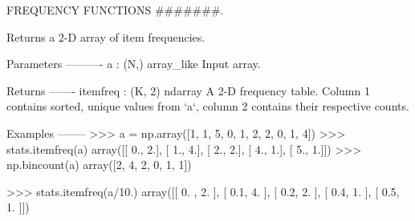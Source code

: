 F\+R\+E\+Q\+U\+E\+N\+C\+Y F\+U\+N\+C\+T\+I\+O\+N\+S \#\#\#\#\#\#\#. 

\begin{DoxyVerb}Returns a 2-D array of item frequencies.

Parameters
----------
a : (N,) array_like
    Input array.

Returns
-------
itemfreq : (K, 2) ndarray
    A 2-D frequency table.  Column 1 contains sorted, unique values from
    `a`, column 2 contains their respective counts.

Examples
--------
>>> a = np.array([1, 1, 5, 0, 1, 2, 2, 0, 1, 4])
>>> stats.itemfreq(a)
array([[ 0.,  2.],
       [ 1.,  4.],
       [ 2.,  2.],
       [ 4.,  1.],
       [ 5.,  1.]])
>>> np.bincount(a)
array([2, 4, 2, 0, 1, 1])

>>> stats.itemfreq(a/10.)
array([[ 0. ,  2. ],
       [ 0.1,  4. ],
       [ 0.2,  2. ],
       [ 0.4,  1. ],
       [ 0.5,  1. ]])\end{DoxyVerb}
 \hypertarget{namespacescipy_1_1stats_1_1stats_a4431b91647766f533c7003141ad52efd}{}
